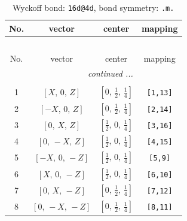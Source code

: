 \documentclass[fleqn,8pt]{jsarticle}
\begin{document}
\renewcommand{\arraystretch}{1.2}
\begin{longtable}{cccc}
\caption{Wyckoff bond: {\tt 16d@4d}, bond symmetry: {\tt .m.}}
 \\
 \hline \hline
No. & vector & center & mapping \\ \hline \endfirsthead

\multicolumn{3}{l}{\tablename\ \thetable{}} \\
 \hline \hline
No. & vector & center & mapping \\ \hline \endhead

 \hline \hline
\multicolumn{3}{r}{\footnotesize\it continued ...} \\ \endfoot

 \hline \hline
\multicolumn{3}{r}{} \\ \endlastfoot

1 & $\left[ X,\, 0,\, Z \right]$ & $\left[ 0,\, \frac{1}{2},\, \frac{1}{4} \right]$ & {\tt [1,13]} \\ \hline
2 & $\left[ - X,\, 0,\, Z \right]$ & $\left[ 0,\, \frac{1}{2},\, \frac{1}{4} \right]$ & {\tt [2,14]} \\ \hline
3 & $\left[ 0,\, X,\, Z \right]$ & $\left[ \frac{1}{2},\, 0,\, \frac{1}{4} \right]$ & {\tt [3,16]} \\ \hline
4 & $\left[ 0,\, - X,\, Z \right]$ & $\left[ \frac{1}{2},\, 0,\, \frac{1}{4} \right]$ & {\tt [4,15]} \\ \hline
5 & $\left[ - X,\, 0,\, - Z \right]$ & $\left[ \frac{1}{2},\, 0,\, \frac{1}{4} \right]$ & {\tt [5,9]} \\ \hline
6 & $\left[ X,\, 0,\, - Z \right]$ & $\left[ \frac{1}{2},\, 0,\, \frac{1}{4} \right]$ & {\tt [6,10]} \\ \hline
7 & $\left[ 0,\, X,\, - Z \right]$ & $\left[ 0,\, \frac{1}{2},\, \frac{1}{4} \right]$ & {\tt [7,12]} \\ \hline
8 & $\left[ 0,\, - X,\, - Z \right]$ & $\left[ 0,\, \frac{1}{2},\, \frac{1}{4} \right]$ & {\tt [8,11]} \\
\end{longtable}
\renewcommand{\arraystretch}{1.2}
\end{document}
